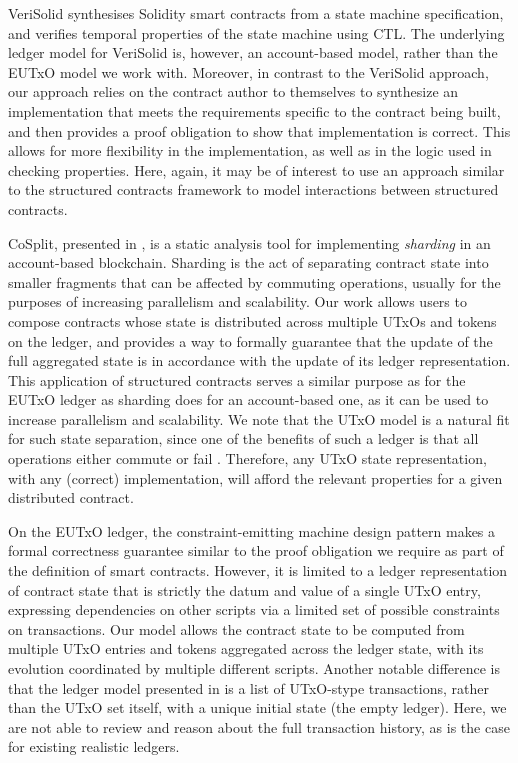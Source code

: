 VeriSolid \cite{verisolid} synthesises Solidity smart contracts from a state machine specification, and
verifies temporal properties of the state machine using CTL. The underlying
ledger model for VeriSolid is, however, an account-based model, rather than the
EUTxO model we work with. Moreover, in contrast
to the VeriSolid approach, our approach
relies on the contract author to themselves to synthesize an implementation
that meets the requirements specific to the contract being built, and then
provides a proof obligation to show that implementation is correct. This allows
for more flexibility in the implementation, as well as in the logic
used in checking properties. Here, again, it may be of interest to use an approach
similar to the structured contracts framework to model interactions between
structured contracts.

CoSplit, presented in \cite{sharding}, is a static analysis tool for implementing
\emph{sharding} in an account-based blockchain. Sharding is the act of
separating contract state into smaller
fragments that can be affected by commuting operations, usually for the purposes of
increasing parallelism and scalability.
Our work allows users to compose contracts whose state is distributed across multiple
UTxOs and tokens on the ledger, and provides a way to formally guarantee that the update of the
full aggregated state is in accordance with the update of its ledger representation.
This application of structured contracts serves a similar purpose as for the EUTxO
ledger as sharding does for an account-based one, as it can be used to increase
parallelism and scalability. We note that the UTxO model is a natural fit for
such state separation, since one of the benefits of such a ledger is that
all operations either commute or fail \cite{parallelism}. Therefore, any
UTxO state representation,
with any (correct) implementation, will afford the relevant properties for a given
distributed contract.

On the EUTxO ledger, the constraint-emitting machine design pattern \cite{eutxoma} makes
a formal correctness guarantee
similar to the proof obligation we require as part of the definition of smart contracts.
However, it is limited to a ledger representation of contract state that is
strictly the datum and value of a
single UTxO entry, expressing dependencies on other scripts via a limited set of
possible constraints on
transactions. Our model allows the contract state to be computed from multiple
UTxO entries and tokens aggregated across the ledger state, with its evolution
coordinated by multiple different scripts. Another notable difference is that
the ledger model presented in \cite{eutxoma} is a list of UTxO-stype transactions,
rather than the UTxO set itself, with a unique initial state (the empty ledger).
Here, we are not able to review and reason about the full transaction history,
as is the case for existing realistic ledgers.

